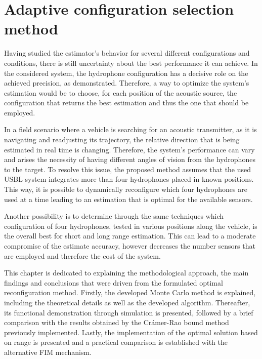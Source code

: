\chapter{Adaptive configuration selection method}  \label{chap:study}

Having studied the estimator's behavior for several different configurations and conditions, there is still uncertainty about the best performance it can achieve. In the considered system, the hydrophone configuration has a decisive role on the achieved precision, as demonstrated. Therefore, a way to optimize the system's estimation would be to choose, for each position of the acoustic source, the configuration that returns the best estimation and thus the one that should be employed.

In a field scenario where a vehicle is searching for an acoustic transmitter, as it is navigating and readjusting its trajectory, the relative direction that is being estimated in real time is changing. Therefore, the system's performance can vary and arises the necessity of having different angles of vision from the hydrophones to the target. To resolve this issue, the proposed method assumes that the used USBL system integrates more than four hydrophones placed in known positions. This way, it is possible to dynamically reconfigure which four hydrophones are used at a time leading to an estimation that is optimal for the available sensors. 

Another possibility is to determine through the same techniques which configuration of four hydrophones, tested in various positions along the vehicle, is the overall best for short and long range estimation. This can lead to a moderate compromise of the estimate accuracy, however decreases the number sensors that are employed and therefore the cost of the system.

This chapter is dedicated to explaining the methodological approach, the main findings and conclusions that were driven from the formulated optimal reconfiguration method. Firstly, the developed Monte Carlo method is explained, including the theoretical details as well as the developed algorithm. Thereafter, its functional demonstration through simulation is presented, followed by a brief comparison with the results obtained by the Crámer-Rao bound method previously implemented. Lastly, the implementation of the optimal solution based on range is presented and a practical comparison is established with the alternative FIM mechanism. 

